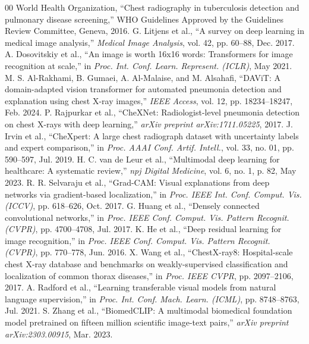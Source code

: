 \documentclass[conference]{IEEEtran}
\begin{document}
\begin{thebibliography}{00}
 World Health Organization, ``Chest radiography in tuberculosis detection and pulmonary disease screening,'' WHO Guidelines Approved by the Guidelines Review Committee, Geneva, 2016.
 G. Litjens et al., ``A survey on deep learning in medical image analysis,'' \textit{Medical Image Analysis}, vol. 42, pp. 60--88, Dec. 2017.
 A. Dosovitskiy et al., ``An image is worth 16x16 words: Transformers for image recognition at scale,'' in \textit{Proc. Int. Conf. Learn. Represent. (ICLR)}, May 2021.
 M. S. Al-Rakhami, B. Gumaei, A. Al-Malaise, and M. Alsahafi, ``DAViT: A domain-adapted vision transformer for automated pneumonia detection and explanation using chest X-ray images,'' \textit{IEEE Access}, vol. 12, pp. 18234--18247, Feb. 2024.
 P. Rajpurkar et al., ``CheXNet: Radiologist-level pneumonia detection on chest X-rays with deep learning,'' \textit{arXiv preprint arXiv:1711.05225}, 2017.
 J. Irvin et al., ``CheXpert: A large chest radiograph dataset with uncertainty labels and expert comparison,'' in \textit{Proc. AAAI Conf. Artif. Intell.}, vol. 33, no. 01, pp. 590--597, Jul. 2019.
 H. C. van de Leur et al., ``Multimodal deep learning for healthcare: A systematic review,'' \textit{npj Digital Medicine}, vol. 6, no. 1, p. 82, May 2023.
 R. R. Selvaraju et al., ``Grad-CAM: Visual explanations from deep networks via gradient-based localization,'' in \textit{Proc. IEEE Int. Conf. Comput. Vis. (ICCV)}, pp. 618--626, Oct. 2017.
 G. Huang et al., ``Densely connected convolutional networks,'' in \textit{Proc. IEEE Conf. Comput. Vis. Pattern Recognit. (CVPR)}, pp. 4700--4708, Jul. 2017.
 K. He et al., ``Deep residual learning for image recognition,'' in \textit{Proc. IEEE Conf. Comput. Vis. Pattern Recognit. (CVPR)}, pp. 770--778, Jun. 2016.
 X. Wang et al., ``ChestX-ray8: Hospital-scale chest X-ray database and benchmarks on weakly-supervised classification and localization of common thorax diseases,'' in \textit{Proc. IEEE CVPR}, pp. 2097--2106, 2017.
 A. Radford et al., ``Learning transferable visual models from natural language supervision,'' in \textit{Proc. Int. Conf. Mach. Learn. (ICML)}, pp. 8748--8763, Jul. 2021.
 S. Zhang et al., ``BiomedCLIP: A multimodal biomedical foundation model pretrained on fifteen million scientific image-text pairs,'' \textit{arXiv preprint arXiv:2303.00915}, Mar. 2023.

\end{thebibliography}
\end{document}
